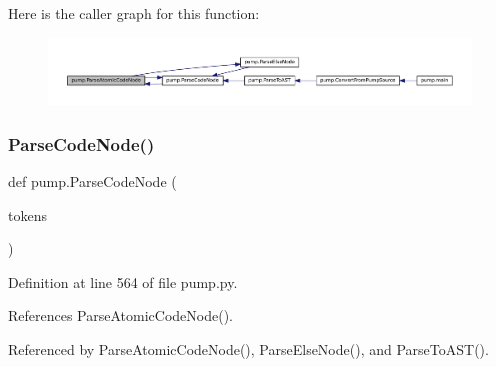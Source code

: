 Here is the caller graph for this function\+:
\nopagebreak
\begin{figure}[H]
\begin{center}
\leavevmode
\includegraphics[width=350pt]{namespacepump_a5532710f334f026f80fc485decf5078e_icgraph}
\end{center}
\end{figure}
\mbox{\label{namespacepump_aabbc064b8664abbe05618b3a0f5a6c38}} 
\subsubsection{\texorpdfstring{Parse\+Code\+Node()}{ParseCodeNode()}}
{\footnotesize\ttfamily def pump.\+Parse\+Code\+Node (\begin{DoxyParamCaption}\item[{}]{tokens }\end{DoxyParamCaption})}



Definition at line 564 of file pump.\+py.



References Parse\+Atomic\+Code\+Node().



Referenced by Parse\+Atomic\+Code\+Node(), Parse\+Else\+Node(), and Parse\+To\+A\+S\+T().


